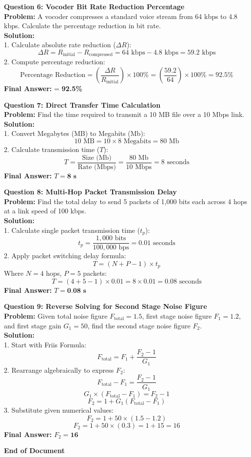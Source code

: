 \documentclass[12pt,a4paper]{report}
\begin{document}
\textbf{Question 6: Vocoder Bit Rate Reduction Percentage} \\
\textbf{Problem:} A vocoder compresses a standard voice stream from 64 kbps to 4.8 kbps. Calculate the percentage reduction in bit rate. \\
\textbf{Solution:} \\
1. Calculate absolute rate reduction ($\Delta R$):
\[ \Delta R = R_{\text{initial}} - R_{\text{compressed}} = 64 \text{ kbps} - 4.8 \text{ kbps} = 59.2 \text{ kbps} \]
2. Compute percentage reduction:
\[ \text{Percentage Reduction} = \left( \frac{\Delta R}{R_{\text{initial}}} \right) \times 100\% = \left( \frac{59.2}{64} \right) \times 100\% = 92.5\% \]
\textbf{Final Answer:}  = \textbf{92.5\%}
\vspace{0.5cm}

\textbf{Question 7: Direct Transfer Time Calculation} \\
\textbf{Problem:} Find the time required to transmit a 10 MB file over a 10 Mbps link. \\
\textbf{Solution:} \\
1. Convert Megabytes (MB) to Megabits (Mb):
\[ 10 \text{ MB} = 10 \times 8 \text{ Megabits} = 80 \text{ Mb} \]
2. Calculate transmission time ($T$):
\[ T = \frac{\text{Size (Mb)}}{\text{Rate (Mbps)}} = \frac{80 \text{ Mb}}{10 \text{ Mbps}} = 8 \text{ seconds} \]
\textbf{Final Answer:} $T = \textbf{8 s}$
\vspace{0.5cm}

\textbf{Question 8: Multi-Hop Packet Transmission Delay} \\
\textbf{Problem:} Find the total delay to send 5 packets of 1,000 bits each across 4 hops at a link speed of 100 kbps. \\
\textbf{Solution:} \\
1. Calculate single packet transmission time ($t_p$):
\[ t_p = \frac{1,000 \text{ bits}}{100,000 \text{ bps}} = 0.01 \text{ seconds} \]
2. Apply packet switching delay formula:
\[ T = (N + P - 1) \times t_p \]
Where $N = 4$ hops, $P = 5$ packets:
\[ T = (4 + 5 - 1) \times 0.01 = 8 \times 0.01 = 0.08 \text{ seconds} \]
\textbf{Final Answer:} $T = \textbf{0.08 s}$
\vspace{0.5cm}

\textbf{Question 9: Reverse Solving for Second Stage Noise Figure} \\
\textbf{Problem:} Given total noise figure $F_{\text{total}} = 1.5$, first stage noise figure $F_1 = 1.2$, and first stage gain $G_1 = 50$, find the second stage noise figure $F_2$. \\
\textbf{Solution:} \\
1. Start with Friis Formula:
\[ F_{\text{total}} = F_1 + \frac{F_2 - 1}{G_1} \]
2. Rearrange algebraically to express $F_2$:
\[ F_{\text{total}} - F_1 = \frac{F_2 - 1}{G_1} \]
\[ G_1 \times (F_{\text{total}} - F_1) = F_2 - 1 \]
\[ F_2 = 1 + G_1(F_{\text{total}} - F_1) \]
3. Substitute given numerical values:
\[ F_2 = 1 + 50 \times (1.5 - 1.2) \]
\[ F_2 = 1 + 50 \times (0.3) = 1 + 15 = 16 \]
\textbf{Final Answer:} $F_2 = \textbf{16}$

\vspace{1.5cm}
\begin{center}
\textbf{End of Document}
\end{center}
\end{document}
